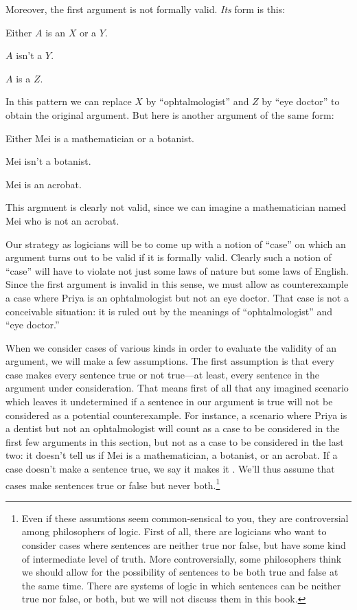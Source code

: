 Moreover, the first argument is not formally valid. \emph{Its} form is this:
\begin{earg}
	\item[] Either $A$ is an $X$ or a $Y$.
	\item[] $A$ isn't a $Y$.
	\item[\therefore] $A$ is a $Z$.
\end{earg}
In this pattern we can replace $X$ by ``ophtalmologist'' and $Z$ by ``eye doctor'' to obtain the original argument.  But here is another argument of the same form:
\begin{earg}
	\item[] Either Mei is a mathematician or a botanist.
	\item[] Mei isn't a botanist.
	\item[\therefore] Mei is an acrobat.
\end{earg}
This argmuent is clearly not valid, since we can imagine a mathematician named Mei who is not an acrobat.

Our strategy as logicians will be to come up with a notion of ``case'' on which an argument turns out to be valid if it is formally valid. Clearly such a notion of ``case'' will have to violate not just some laws of nature but some laws of English. Since the first argument is invalid in this sense, we must allow as counterexample a case where Priya is an ophtalmologist but not an eye doctor.  That case is not a conceivable situation: it is ruled out by the meanings of ``ophtalmologist'' and ``eye doctor.''

When we consider cases of various kinds in order to evaluate the validity of an argument, we will make a few assumptions. The first assumption is that every case makes every sentence true or not true---at least, every sentence in the argument under consideration. That means first of all that any imagined scenario which leaves it undetermined if a sentence in our argument is true will not be considered as a potential counterexample. For instance, a scenario where Priya is a dentist but not an ophtalmologist will count as a case to be considered in the first few arguments in this section, but not as a case to be considered in the last two: it doesn't tell us if Mei is a mathematician, a botanist, or an acrobat. If a case doesn't make a sentence true, we say it makes it . We'll thus assume that cases make sentences true or false but never both.\footnote{Even if these assumtions seem common-sensical to you, they are controversial among philosophers of logic. First of all, there are logicians who want to consider cases where sentences are neither true nor false, but have some kind of intermediate level of truth. More controversially, some philosophers think we should allow for the possibility of sentences to be both true and false at the same time. There are systems of logic in which sentences can be neither true nor false, or both, but we will not discuss them in this book.}

